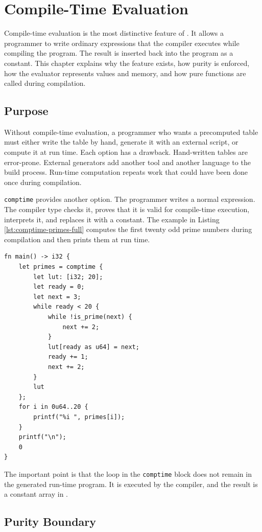 \chapter{Compile-Time Evaluation}
\label{chap:comptime}

Compile-time evaluation is the most distinctive feature of \epl{}. It allows a
programmer to write ordinary \epl{} expressions that the compiler executes while
compiling the program. The result is inserted back into the program as a
constant. This chapter explains why the feature exists, how purity is enforced,
how the evaluator represents values and memory, and how pure functions are
called during compilation.

\section{Purpose}

Without compile-time evaluation, a programmer who wants a precomputed table must
either write the table by hand, generate it with an external script, or compute
it at run time. Each option has a drawback. Hand-written tables are error-prone.
External generators add another tool and another language to the build process.
Run-time computation repeats work that could have been done once during
compilation.

\texttt{comptime} provides another option. The programmer writes a normal
expression. The compiler type checks it, proves that it is valid for
compile-time execution, interprets it, and replaces it with a constant. The
example in Listing \ref{lst:comptime-primes-full} computes the first twenty odd
prime numbers during compilation and then prints them at run time.

\begin{lstlisting}[language=EPL,caption={Compile-time prime table example},label={lst:comptime-primes-full}]
fn main() -> i32 {
	let primes = comptime {
		let lut: [i32; 20];
		let ready = 0;
		let next = 3;
		while ready < 20 {
			while !is_prime(next) {
				next += 2;
			}
			lut[ready as u64] = next;
			ready += 1;
			next += 2;
		}
		lut
	};
	for i in 0u64..20 {
		printf("%i ", primes[i]);
	}
	printf("\n");
	0
}
\end{lstlisting}

The important point is that the loop in the \texttt{comptime} block does not
remain in the generated run-time program. It is executed by the compiler, and
the result is a constant array in \irtree{}.

\section{Purity Boundary}

